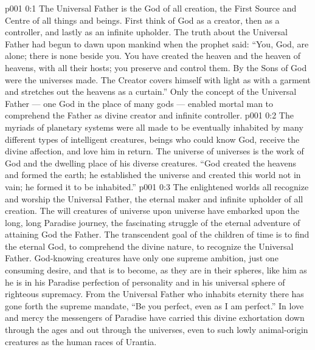 \author{Divine Counsellor}
\vs p001 0:1 The Universal Father is the God of all creation, the First Source and Centre of all things and beings. First think of God as a creator, then as a controller, and lastly as an infinite upholder. The truth about the Universal Father had begun to dawn upon mankind when the prophet said: “You, God, are alone; there is none beside you. You have created the heaven and the heaven of heavens, with all their hosts; you preserve and control them. By the Sons of God were the universes made. The Creator covers himself with light as with a garment and stretches out the heavens as a curtain.” Only the concept of the Universal Father --- one God in the place of many gods --- enabled mortal man to comprehend the Father as divine creator and infinite controller.
\vs p001 0:2 The myriads of planetary systems were all made to be eventually inhabited by many different types of intelligent creatures, beings who could know God, receive the divine affection, and love him in return. The universe of universes is the work of God and the dwelling place of his diverse creatures. “God created the heavens and formed the earth; he established the universe and created this world not in vain; he formed it to be inhabited.”
\vs p001 0:3 The enlightened worlds all recognize and worship the Universal Father, the eternal maker and infinite upholder of all creation. The will creatures of universe upon universe have embarked upon the long, long Paradise journey, the fascinating struggle of the eternal adventure of attaining God the Father. The transcendent goal of the children of time is to find the eternal God, to comprehend the divine nature, to recognize the Universal Father. God\hyp{}knowing creatures have only one supreme ambition, just one consuming desire, and that is to become, as they are in their spheres, like him as he is in his Paradise perfection of personality and in his universal sphere of righteous supremacy. From the Universal Father who inhabits eternity there has gone forth the supreme mandate, “Be you perfect, even as I am perfect.” In love and mercy the messengers of Paradise have carried this divine exhortation down through the ages and out through the universes, even to such lowly animal\hyp{}origin creatures as the human races of Urantia.
